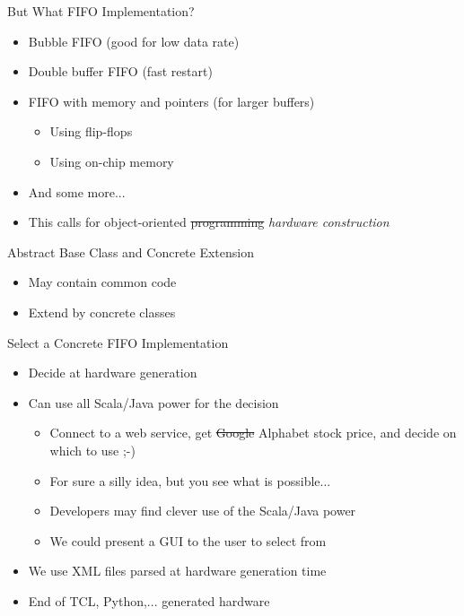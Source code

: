 \begin{frame}[fragile]{But What FIFO Implementation?}
\begin{itemize}
\item Bubble FIFO (good for low data rate)
\item Double buffer FIFO (fast restart)
\item FIFO with memory and pointers (for larger buffers)
\begin{itemize}
\item Using flip-flops
\item Using on-chip memory
\end{itemize}
\item And some more...
\end{itemize}
\begin{itemize}
\item This calls for object-oriented \sout{programming} \emph{hardware construction}
\end{itemize}
\end{frame}

\begin{frame}[fragile]{Abstract Base Class and Concrete Extension}
\begin{itemize}
\item May contain common code
\item Extend by concrete classes
\end{itemize}
\begin{chisel}
class BubbleFifo[T <: Data](gen: T, depth: Int) extends Fifo(gen: T, depth: Int) {
\end{chisel}
\end{frame}



\begin{frame}[fragile]{Select a Concrete FIFO Implementation}
\begin{itemize}
\item Decide at hardware generation
\item Can use all Scala/Java power for the decision
\begin{itemize}
\item Connect to a web service, get \sout{Google} Alphabet stock price, and decide on which to use ;-)
\item For sure a silly idea, but you see what is possible...
\item Developers may find clever use of the Scala/Java power
\item We could present a GUI to the user to select from
\end{itemize}
\item We use XML files parsed at hardware generation time
\item End of TCL, Python,... generated hardware
\end{itemize}
\end{frame}

